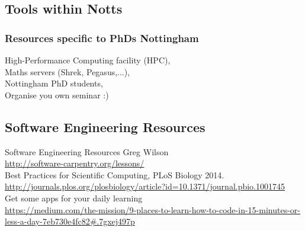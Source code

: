 \documentclass[]{beamer} %
\begin{document}
\subsection{Tools within Notts}
\begin{frame}[fragile]\frametitle{Resources specific to PhDs Nottingham}
High-Performance Computing facility (HPC),\\
Maths servers (Shrek, Pegasus,...), \\
Nottingham  PhD students,\\
Organise you own seminar :)
\end{frame}


\subsection{Software Engineering Resources}
\begin{frame}{Software Engineering Resources}
Greg Wilson\\
\small{\url{http://software-carpentry.org/lessons/}}\\[2mm]
Best Practices for Scientific Computing, PLoS Biology 2014. \\
\small{\url{http://journals.plos.org/plosbiology/article?id=10.1371/journal.pbio.1001745}}\\[2mm]
Get some apps for your daily learning\\
{\tiny{\url{https://medium.com/the-mission/9-places-to-learn-how-to-code-in-15-minutes-or-less-a-day-7eb730e4fc82\#.7gxej497p}}}
\end{frame}
\end{document}
